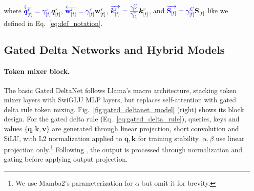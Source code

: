 \documentclass{article}
\def\rmS{{\mathbf{S}}}
\def\vk{{\bm{k}}}
\def\vq{{\bm{q}}}
\def\vv{{\bm{v}}}
\def\vw{{\bm{w}}}
\def\vw{\mathbf{w}}
\begin{document}
where $\color{blue} \overleftarrow{\vq_{[t]}^r}=\gamma_{[t]}^r \color{black}\vq_{[t]}^r$, $\color{blue} \overleftarrow{\vw_{[t]}^r}=\gamma_{[t]}^r \color{black}\vw_{[t]}^r$, $\color{blue} \overrightarrow{\vk_{[t]}^r}=\frac{\gamma_{[t]}^C}{\gamma_{[t]}^r} \color{black}\vk_{[t]}^r$, and $\color{blue} \overrightarrow{\rmS_{[t]}}= \gamma_{[t]}^C \color{black}\rmS_{[t]}$ like we defined in Eq.~\ref{eq:def_notation}.
\vspace{-2mm}
\subsection{Gated Delta Networks and Hybrid Models}
 \label{sec:arch_design}
\paragraph{Token mixer block.}
The basic Gated DeltaNet follows Llama's macro architecture, stacking token mixer layers with SwiGLU MLP layers, but replaces self-attention with gated delta rule token mixing. Fig.~\ref{fig:gated_deltanet_model} (right) shows its block design. For the gated delta rule (Eq.~\ref{eq:gated_delta_rule}), queries, keys and values $\{\vq, \vk, \vv\}$ are generated through linear projection, short convolution and SiLU, with L2 normalization applied to $\vq, \vk$ for training stability. $\alpha, \beta$ use linear projection only.\footnote{We use Mamba2's parameterization for $\alpha$ but omit it for brevity.}  Following \citet{sun2023retentive}, the output is processed through normalization and gating before applying output projection.
\end{document}
